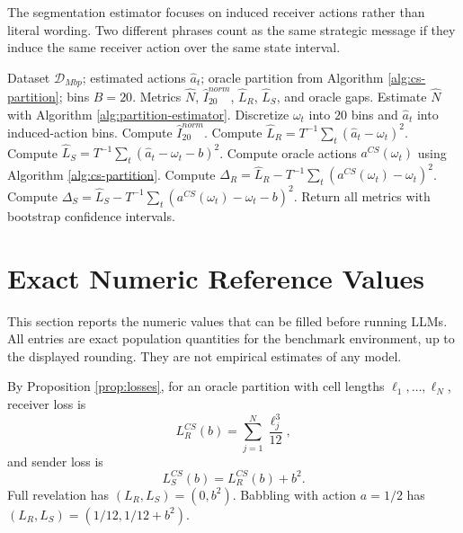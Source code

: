 \documentclass[11pt]{article}
\newcommand{\calD}{\mathcal{D}}
\begin{document}
The segmentation estimator focuses on induced receiver actions rather than literal wording.  Two different phrases count as the same strategic message if they induce the same receiver action over the same state interval.

\begin{algorithm}[H]
\caption{Evaluate a model-frame-bias cell}
\label{alg:evaluate}
\begin{algorithmic}[1]
\Require Dataset $\calD_{Mbp}$; estimated actions $\widehat a_t$; oracle partition from Algorithm \ref{alg:cs-partition}; bins $B=20$.
\Ensure Metrics $\widehat N$, $\widehat I^{norm}_{20}$, $\widehat L_R$, $\widehat L_S$, and oracle gaps.
\State Estimate $\widehat N$ with Algorithm \ref{alg:partition-estimator}.
\State Discretize $\omega_t$ into $20$ bins and $\widehat a_t$ into induced-action bins.
\State Compute $\widehat I^{norm}_{20}$.
\State Compute $\widehat L_R=T^{-1}\sum_t(\widehat a_t-\omega_t)^2$.
\State Compute $\widehat L_S=T^{-1}\sum_t(\widehat a_t-\omega_t-b)^2$.
\State Compute oracle actions $a^{CS}(\omega_t)$ using Algorithm \ref{alg:cs-partition}.
\State Compute $\Delta_R=\widehat L_R-T^{-1}\sum_t(a^{CS}(\omega_t)-\omega_t)^2$.
\State Compute $\Delta_S=\widehat L_S-T^{-1}\sum_t(a^{CS}(\omega_t)-\omega_t-b)^2$.
\State Return all metrics with bootstrap confidence intervals.
\end{algorithmic}
\end{algorithm}

\section{Exact Numeric Reference Values}\label{sec:numeric-reference}

This section reports the numeric values that can be filled before running LLMs.  All entries are exact population quantities for the benchmark environment, up to the displayed rounding.  They are not empirical estimates of any model.

By Proposition \ref{prop:losses}, for an oracle partition with cell lengths $\ell_1,\ldots,\ell_N$, receiver loss is
\begin{equation}
    L_R^{CS}(b)=\sum_{j=1}^{N}\frac{\ell_j^3}{12},
\end{equation}
and sender loss is
\begin{equation}
    L_S^{CS}(b)=L_R^{CS}(b)+b^2.
\end{equation}
Full revelation has $(L_R,L_S)=(0,b^2)$.  Babbling with action $a=1/2$ has $(L_R,L_S)=(1/12,1/12+b^2)$.
\end{document}

